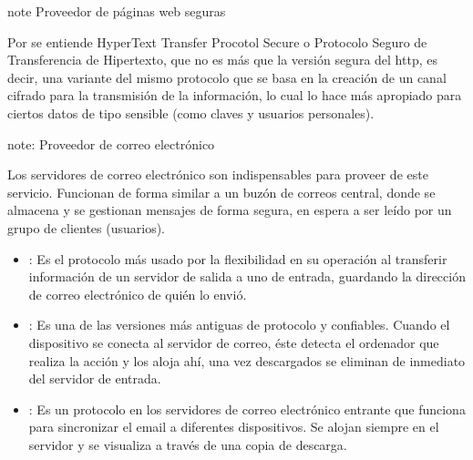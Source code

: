 \documentclass[letterpaper,10pt,spanish]{sphinxmanual}
\begin{document}
\begin{sphinxadmonition}{note}{ Proveedor de páginas web seguras}

\sphinxAtStartPar
Por  se entiende HyperText Transfer Procotol Secure o Protocolo Seguro de Transferencia de Hipertexto, que no es más que la versión segura del http, es decir, una variante del mismo protocolo que se basa en la creación de un canal cifrado para la transmisión de la información, lo cual lo hace más apropiado para ciertos datos de tipo sensible (como claves y usuarios personales).
\end{sphinxadmonition}

\begin{sphinxadmonition}{note}{: Proveedor de correo electrónico}

\sphinxAtStartPar
Los servidores de correo electrónico son indispensables para proveer de este servicio. Funcionan de forma similar a un buzón de correos central, donde se almacena y se gestionan mensajes de forma segura, en espera a ser leído por un grupo de clientes (usuarios).
\begin{itemize}
\item {} 
\sphinxAtStartPar
{}: Es el protocolo más usado por la flexibilidad en su operación al transferir información de un servidor de salida a uno de entrada, guardando la dirección de correo electrónico de quién lo envió.

\item {} 
\sphinxAtStartPar
{}: Es una de las versiones más antiguas de protocolo y confiables. Cuando el dispositivo se conecta al servidor de correo, éste detecta el ordenador que realiza la acción y los aloja ahí, una vez descargados se eliminan de inmediato del servidor de entrada.

\item {} 
\sphinxAtStartPar
{}: Es un protocolo en los servidores de correo electrónico entrante que funciona para sincronizar el email a diferentes dispositivos. Se alojan siempre en el servidor y se visualiza a través de una copia de descarga.

\end{itemize}
\end{sphinxadmonition}
\end{document}
